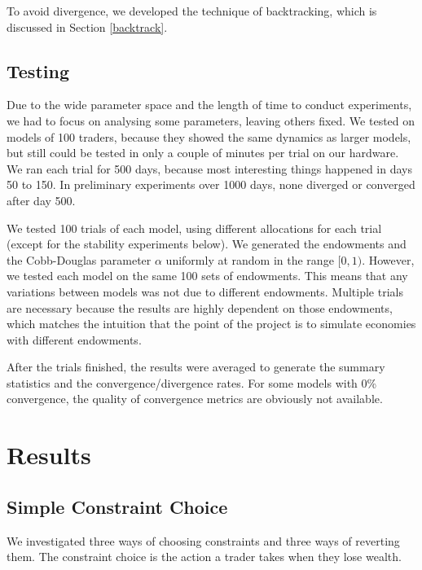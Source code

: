 \documentclass[12pt,a4paper,titlepage]{article}
\begin{document}
To avoid divergence, we developed the technique of backtracking, which is discussed in Section \ref{backtrack}.

\subsection{Testing}
Due to the wide parameter space and the length of time to conduct experiments, we had to focus on analysing some parameters, leaving others fixed.
We tested on models of 100 traders, because they showed the same dynamics as larger models, but still could be tested in only a couple of minutes per trial on our hardware.
We ran each trial for 500 days, because most interesting things happened in days 50 to 150.
In preliminary experiments over 1000 days, none diverged or converged after day 500.

We tested 100 trials of each model, using different allocations for each trial (except for the stability experiments below).
We generated the endowments and the Cobb-Douglas parameter $\alpha$ uniformly at random in the range $[0, 1)$.
However, we tested each model on the same 100 sets of endowments.
This means that any variations between models was not due to different endowments.
Multiple trials are necessary because the results are highly dependent on those endowments, which matches the intuition that the point of the project is to simulate economies with different endowments.
    
After the trials finished, the results were averaged to generate the summary statistics and the convergence/divergence rates.
For some models with 0\% convergence, the quality of convergence metrics are obviously not available.

\clearpage

\section{Results}\label{results}
\subsection{Simple Constraint Choice}
We investigated three ways of choosing constraints and three ways of reverting them.
The constraint choice is the action a trader takes when they lose wealth.
\end{document}
